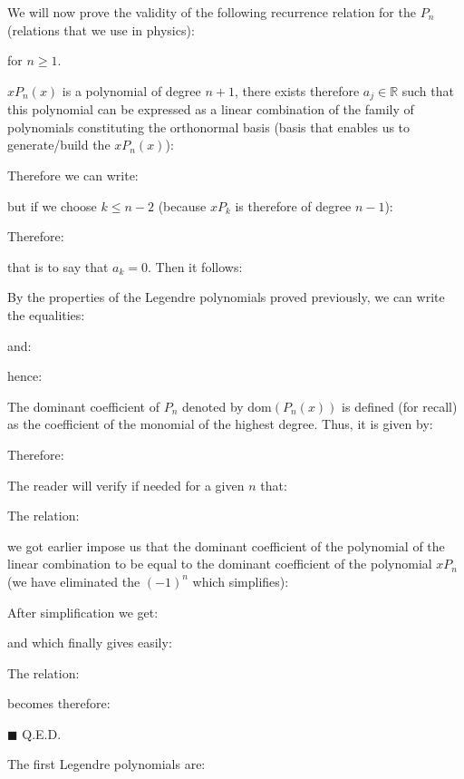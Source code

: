 	\begin{theorem}
	We will now prove the validity of the following recurrence relation for the $P_n$ (relations that we use in physics):
	
	for $n \geq 1$.
	\end{theorem}
	\begin{dem}
	$xP_n(x)$ is a polynomial of degree $n+1$, there exists therefore $a_j\in \mathbb{R}$ such that this polynomial can be expressed as a linear combination of the family of polynomials constituting the orthonormal basis (basis that enables us to generate/build the $xP_n(x)$):
	
	Therefore we can write:
	
	but if we choose $k\leq n-2$ (because $xP_k$ is therefore of degree $n-1$):
	
	Therefore:
	
	that is to say that $a_k=0$. Then it follows:
	
	By the properties of the Legendre polynomials proved previously, we can write the equalities:
	
	and:
	
	hence:
	
	The dominant coefficient of $P_n$ denoted by $\text{dom}(P_n(x))$ is defined (for recall) as the coefficient of the monomial of the highest degree. Thus, it is given by:
	
	Therefore:
	
	\begin{tcolorbox}[title=Remark,colframe=black,arc=10pt]
	The reader will verify if needed for a given $n$ that:
	
	\end{tcolorbox}
	The relation:
	
	we got earlier impose us that the dominant coefficient of the polynomial of the linear combination to be equal to the dominant coefficient of the polynomial $xP_n$ (we have eliminated the $(-1)^n$ which simplifies):
	
	After simplification we get:
	
	and which finally gives easily:
	
	The relation:
	
	becomes therefore:
		
	\begin{flushright}
		$\blacksquare$  Q.E.D.
	\end{flushright}
	\end{dem}
	The first Legendre polynomials are:
	

